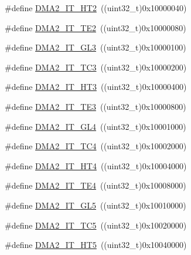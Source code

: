 \begin{DoxyCompactItemize}
\item 
\#define \hyperlink{group___d_m_a__interrupts__definition_gaf1cb017935477795a7bfb0d1a271e69a}{D\+M\+A2\+\_\+\+I\+T\+\_\+\+H\+T2}~((uint32\+\_\+t)0x10000040)
\item 
\#define \hyperlink{group___d_m_a__interrupts__definition_ga5f32004b492a225495c9c1dcd5002042}{D\+M\+A2\+\_\+\+I\+T\+\_\+\+T\+E2}~((uint32\+\_\+t)0x10000080)
\item 
\#define \hyperlink{group___d_m_a__interrupts__definition_ga9876a20bc7ae5ccff6d4e62a8b767070}{D\+M\+A2\+\_\+\+I\+T\+\_\+\+G\+L3}~((uint32\+\_\+t)0x10000100)
\item 
\#define \hyperlink{group___d_m_a__interrupts__definition_ga249abc1068e8979f52d7d867b5de5a75}{D\+M\+A2\+\_\+\+I\+T\+\_\+\+T\+C3}~((uint32\+\_\+t)0x10000200)
\item 
\#define \hyperlink{group___d_m_a__interrupts__definition_gab3c0d024e03f9fdca539710c7e528904}{D\+M\+A2\+\_\+\+I\+T\+\_\+\+H\+T3}~((uint32\+\_\+t)0x10000400)
\item 
\#define \hyperlink{group___d_m_a__interrupts__definition_ga2fd4ce5d7e2d67c05379f826ae1b1da6}{D\+M\+A2\+\_\+\+I\+T\+\_\+\+T\+E3}~((uint32\+\_\+t)0x10000800)
\item 
\#define \hyperlink{group___d_m_a__interrupts__definition_ga004761fbcd7dba2f242639b2992ada17}{D\+M\+A2\+\_\+\+I\+T\+\_\+\+G\+L4}~((uint32\+\_\+t)0x10001000)
\item 
\#define \hyperlink{group___d_m_a__interrupts__definition_ga54b6716e82894f76c87926afe2a65f30}{D\+M\+A2\+\_\+\+I\+T\+\_\+\+T\+C4}~((uint32\+\_\+t)0x10002000)
\item 
\#define \hyperlink{group___d_m_a__interrupts__definition_ga4aa775a2f1e10783bd43911ad65bb28b}{D\+M\+A2\+\_\+\+I\+T\+\_\+\+H\+T4}~((uint32\+\_\+t)0x10004000)
\item 
\#define \hyperlink{group___d_m_a__interrupts__definition_ga54dfd8a41ad683f01e3103e6473a7aff}{D\+M\+A2\+\_\+\+I\+T\+\_\+\+T\+E4}~((uint32\+\_\+t)0x10008000)
\item 
\#define \hyperlink{group___d_m_a__interrupts__definition_ga2205d7e002767d98f7aa206634374082}{D\+M\+A2\+\_\+\+I\+T\+\_\+\+G\+L5}~((uint32\+\_\+t)0x10010000)
\item 
\#define \hyperlink{group___d_m_a__interrupts__definition_gaa1134531a0aeb8daeb516985562129b0}{D\+M\+A2\+\_\+\+I\+T\+\_\+\+T\+C5}~((uint32\+\_\+t)0x10020000)
\item 
\#define \hyperlink{group___d_m_a__interrupts__definition_ga4c1e0d1572267c1d48d787009148e3ef}{D\+M\+A2\+\_\+\+I\+T\+\_\+\+H\+T5}~((uint32\+\_\+t)0x10040000)

\end{DoxyCompactItemize}
